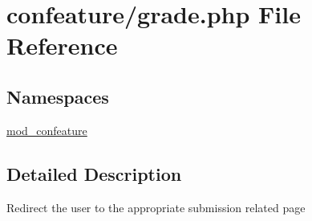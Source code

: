 \hypertarget{grade_8php}{\section{confeature/grade.php File Reference}
\label{grade_8php}
}
\subsection*{Namespaces}
\begin{DoxyCompactItemize}
\item 
\hyperlink{namespacemod__confeature}{mod\-\_\-confeature}
\end{DoxyCompactItemize}


\subsection{Detailed Description}
Redirect the user to the appropriate submission related page 